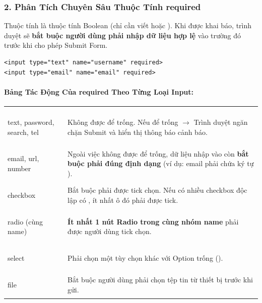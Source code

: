 \subsubsection{2. Phân Tích Chuyên Sâu Thuộc Tính required}

\begin{conceptBox}
Thuộc tính  là thuộc tính Boolean (chỉ cần viết  hoặc ). Khi được khai báo, trình duyệt sẽ \textbf{bắt buộc người dùng phải nhập dữ liệu hợp lệ} vào trường đó trước khi cho phép Submit Form.
\end{conceptBox}

\begin{codeWindow}
\begin{lstlisting}[language=HTML5]
<input type="text" name="username" required>
<input type="email" name="email" required>
\end{lstlisting}
\end{codeWindow}

\paragraph{Bảng Tác Động Của required Theo Từng Loại Input:}

\begin{prettyTableBox}
\sffamily\small
\begin{tabularx}{\linewidth}{>{\ttfamily\color{primaryBlue}\bfseries\raggedright\arraybackslash}m{3.4cm} Z}
 &  \\

text, password, search, tel & Không được để trống. Nếu để trống $\rightarrow$ Trình duyệt ngăn chặn Submit và hiển thị thông báo cảnh báo. \\

email, url, number & Ngoài việc không được để trống, dữ liệu nhập vào còn \textbf{bắt buộc phải đúng định dạng} (ví dụ: email phải chứa ký tự ). \\

checkbox & Bắt buộc phải được tick chọn. Nếu có nhiều checkbox độc lập có , ít nhất ô đó phải được tick. \\

radio (cùng name) & \textbf{Ít nhất 1 nút Radio trong cùng nhóm name} phải được người dùng tick chọn. \\

select & Phải chọn một tùy chọn khác với Option trống (). \\

file & Bắt buộc người dùng phải chọn tệp tin từ thiết bị trước khi gửi. \\
\end{tabularx}
\end{prettyTableBox}

